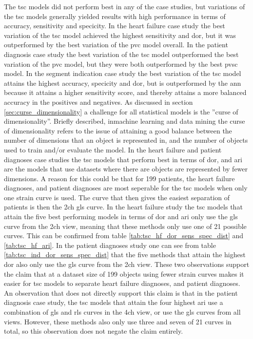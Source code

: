 The \acrshort{tsc} models did not perform best in any of the case studies, but variations of the \acrshort{tsc} models generally yielded results with high performance in terms of accuracy, sensitivity and specicity. In the heart failure case study the best variation of the \acrshort{tsc} model achieved the highest sensitivity and \acrshort{dor}, but it was outperformed by the best variation of the \acrshort{pvc} model overall. In the patient diagnosis case study the best variation of the \acrshort{tsc} model outperformed the best variation of the \acrshort{pvc} model, but they were both outperformed by the best \acrshort{pvsc} model. In the segment indication case study the best variation of the \acrshort{tsc} model attains the highest accuracy, specicity and \acrshort{dor}, but is outperformed by the \acrshort{ann} because it attains a higher sensitivity score, and thereby attains a more balanced accuracy in the positives and negatives. \bigskip
As discussed in section \ref{sec:curse_dimensionality} a challenge for all statistical models is the ''curse of dimensionality''. Briefly described, inmachine learning and data mining the curse of dimensionality refers to the issue of attaining a good balance between the number of dimensions that an object is represented in, and the number of objects used to train and/or evaluate the model. In the heart failure and patient diagnoses case studies the \acrshort{tsc} models that perform best in terms of \acrshort{dor}, and \acrshort{ari} are the models that use datasets where there are objects are represented by fewer dimensions. A reason for this could be that for 199 patients, the heart failure diagnoses, and patient diagnoses are most seperable for the \acrshort{tsc} models when only one strain curve is used. The curve that then gives the easiest separation of patients is then the \acrshort{2ch} \acrshort{gls} curve. In the heart failure study the \acrshort{tsc} models that attain the five best performing models in terms of \acrshort{dor} and \acrshort{ari} only use the \acrshort{gls} curve from the \acrshort{2ch} view, meaning that these methods only use one of 21 possible curves. This can be confirmed from table \ref{tab:tsc_hf_dor_sens_spec_dist} and \ref{tab:tsc_hf_ari}. In the patient diagnoses study one can see from table \ref{tab:tsc_ind_dor_sens_spec_dist} that the five methods that attain the highest \acrshort{dor} also only use the \acrshort{gls} curve from the \acrshort{2ch} view. These two observations support the claim that at a dataset size of 199 objects using fewer strain curves makes it easier for \acrshort{tsc} models to separate heart failure diagnoses, and patient diagnoses. An observation that does not directly support this claim is that in the patient diagnosis case study, the \acrshort{tsc} models that attain the four highest \acrshort{ari} use a combination of \acrshort{gls} and \acrshort{rls} curves in the \acrshort{4ch} view, or use the \acrshort{gls} curves from all views. However, these methods also only use three and seven of 21 curves in total, so this observation does not negate the claim entirely. \bigskip
